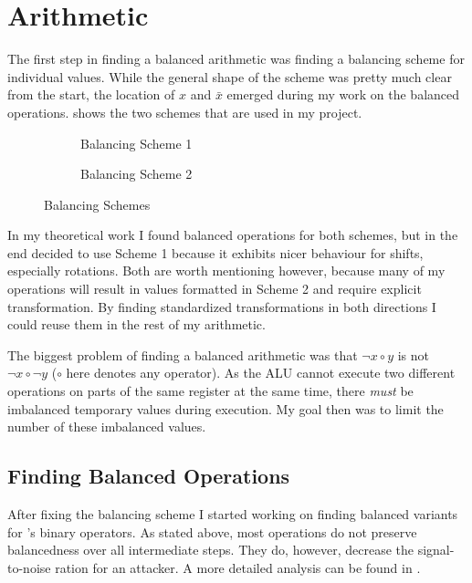 \section{Arithmetic}
\label{arithmetic}
The first step in finding a balanced arithmetic was finding a balancing scheme for individual values.
While the general shape of the scheme was pretty much clear from the start, the location of $x$ and $\bar{x}$ emerged during my work on the balanced operations.
 shows the two schemes that are used in my project.

\begin{figure}[h]
  \centering
  \begin{subfigure}{.49\linewidth}
    \centering
    \caption{Balancing Scheme 1}
    \label{fig:scheme1}
  \end{subfigure}
  \begin{subfigure}{0.49\linewidth}
    \centering
    \caption{Balancing Scheme 2}
  \end{subfigure}
  \caption{Balancing Schemes}
  \label{fig:schemes}
\end{figure}

In my theoretical work I found balanced operations for both schemes, but in the end decided to use Scheme 1 because it exhibits nicer behaviour for shifts, especially rotations.
Both are worth mentioning however, because many of my operations will result in values formatted in Scheme 2 and require explicit transformation.
By finding standardized transformations in both directions I could reuse them in the rest of my arithmetic.

The biggest problem of finding a balanced arithmetic was that $\neg{x \circ y}$ is not $\neg{x} \circ \neg{y}$ ($\circ$ here denotes any operator).
As the ALU cannot execute two different operations on parts of the same register at the same time, there \emph{must} be imbalanced temporary values during execution.
My goal then was to limit the number of these imbalanced values.

\subsection{Finding Balanced Operations}
\label{operations}
After fixing the balancing scheme I started working on finding balanced variants for \ir{}'s binary operators.
As stated above, most operations do not preserve balancedness over all intermediate steps.
They do, however, decrease the signal-to-noise ration for an attacker.
A more detailed analysis can be found in .

